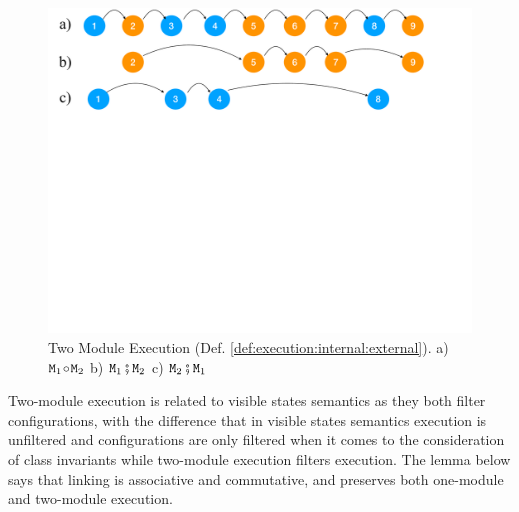\begin{figure}[htb]
  \vspace*{-2.5mm}
  \begin{center}
   \begin{minipage}{0.80\textwidth}
     \begin{center}
       \includegraphics[width=\linewidth]{diagrams/VisibleStates.pdf}
     \end{center}
   \end{minipage}
   \end{center}
   \vspace*{-2.5mm}
   \caption{Two Module Execution
     (Def. \ref{def:execution:internal:external}). %
     a) ${\mbox{\tt{\ensuremath{{\mbox{\tt{M}}}}}}}_1 \!\circ\! {\mbox{\tt{\ensuremath{{\mbox{\tt{M}}}}}}}_2$ b) ${\mbox{\tt{\ensuremath{{\mbox{\tt{M}}}}}}}_1 \fatsemi {\mbox{\tt{\ensuremath{{\mbox{\tt{M}}}}}}}_2$ c) ${\mbox{\tt{\ensuremath{{\mbox{\tt{M}}}}}}}_2 \fatsemi {\mbox{\tt{\ensuremath{{\mbox{\tt{M}}}}}}}_1$}
   \label{fig:VisibleStates}
 \end{figure}

Two-module execution  is related to %
visible states
semantics \cite{MuellerPoetzsch-HeffterLeavens06} as they both filter configurations, with  the difference
that in visible states semantics %
execution is unfiltered and  configurations are only filtered when it comes to the  consideration 
of class invariants while two-module execution filters execution.
%
The lemma below says  that linking is associative and commutative, and preserves   both one-module and two-module execution.


